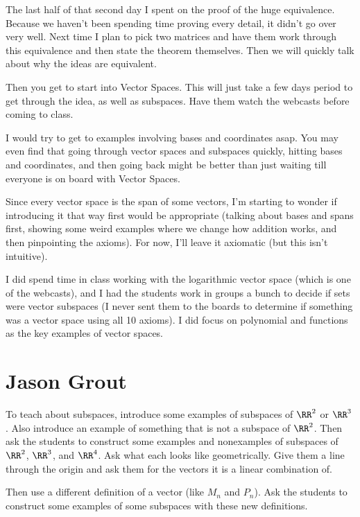 The last half of that second day I spent on the proof of the huge equivalence.  Because we haven't been spending time proving every detail, it didn't go over very well.  Next time I plan to pick two matrices and have them work through this equivalence and then state the theorem themselves.  Then we will quickly talk about why the ideas are equivalent.

Then you get to start into Vector Spaces.  This will just take a few days period to get through the idea, as well as subspaces.  Have them watch the webcasts before coming to class.

I would try to get to examples involving bases and coordinates asap. You may even find that going through vector spaces and subspaces quickly, hitting bases and coordinates, and then going back might be better than just waiting till everyone is on board with Vector Spaces.

Since every vector space is the span of some vectors, I'm starting to wonder if introducing it that way first would be appropriate (talking about bases and spans first, showing some weird examples where we change how addition works, and then pinpointing the axioms).  For now, I'll leave it axiomatic (but this isn't intuitive).

I did spend time in class working with the logarithmic vector space (which is one of the webcasts), and I had the students work in groups a bunch to decide if sets were vector subspaces (I never sent them to the boards to determine if something was a vector space using all 10 axioms).  I did focus on polynomial and functions as the key examples of vector spaces.

\section{Jason Grout}

To teach about subspaces, introduce some examples of subspaces of $\RR^2$ or $\RR^3$.  Also introduce an example of something that is not a subspace of $\RR^2$.  Then ask the students to construct some examples and nonexamples of subspaces of $\RR^2$, $\RR^3$, and $\RR^4$.  Ask what each looks like geometrically.  Give them a line through the origin and ask them for the vectors it is a linear combination of.

Then use a different definition of a vector (like $M_n$ and $P_n$).  Ask the students to construct some examples of some subspaces with these new definitions.

